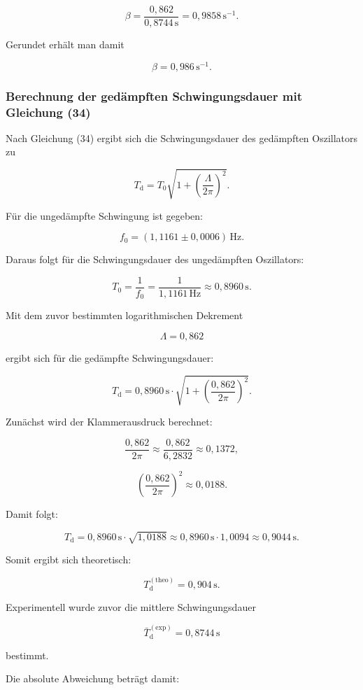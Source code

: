 \documentclass{report}
\begin{document}
\[
\beta = \frac{0{,}862}{0{,}8744\,\mathrm{s}} = 0{,}9858\,\mathrm{s^{-1}}.
\]

Gerundet erhält man damit

\[
\boxed{\beta = 0{,}986\,\mathrm{s^{-1}}.}
\]

\subsubsection*{Berechnung der gedämpften Schwingungsdauer mit Gleichung (34)}

Nach Gleichung (34) ergibt sich die Schwingungsdauer des gedämpften Oszillators zu

\[
T_\mathrm{d} = T_0 \sqrt{1+\left(\frac{\Lambda}{2\pi}\right)^2}.
\]

Für die ungedämpfte Schwingung ist gegeben:

\[
f_0 = (1{,}1161 \pm 0{,}0006)\,\mathrm{Hz}.
\]

Daraus folgt für die Schwingungsdauer des ungedämpften Oszillators:

\[
T_0 = \frac{1}{f_0} = \frac{1}{1{,}1161\,\mathrm{Hz}} \approx 0{,}8960\,\mathrm{s}.
\]

Mit dem zuvor bestimmten logarithmischen Dekrement

\[
\Lambda = 0{,}862
\]

ergibt sich für die gedämpfte Schwingungsdauer:

\[
T_\mathrm{d} = 0{,}8960\,\mathrm{s}\cdot \sqrt{1+\left(\frac{0{,}862}{2\pi}\right)^2}.
\]

Zunächst wird der Klammerausdruck berechnet:

\[
\frac{0{,}862}{2\pi} \approx \frac{0{,}862}{6{,}2832} \approx 0{,}1372,
\]

\[
\left(\frac{0{,}862}{2\pi}\right)^2 \approx 0{,}0188.
\]

Damit folgt:

\[
T_\mathrm{d} = 0{,}8960\,\mathrm{s}\cdot \sqrt{1{,}0188}
\approx 0{,}8960\,\mathrm{s}\cdot 1{,}0094
\approx 0{,}9044\,\mathrm{s}.
\]

Somit ergibt sich theoretisch:

\[
\boxed{T_\mathrm{d}^{(\mathrm{theo})} = 0{,}904\,\mathrm{s}}.
\]

Experimentell wurde zuvor die mittlere Schwingungsdauer

\[
\bar{T}_\mathrm{d}^{(\mathrm{exp})} = 0{,}8744\,\mathrm{s}
\]

bestimmt.

Die absolute Abweichung beträgt damit:
\end{document}

